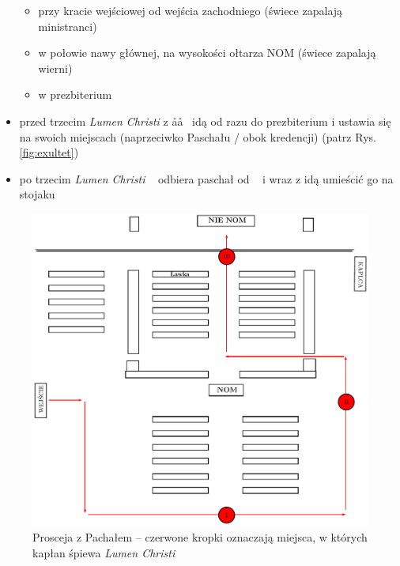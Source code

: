 \begin{itemize}
	      \begin{itemize}
		      \item przy kracie wejściowej od wejścia zachodniego (świece
		            zapalają ministranci)
		      \item w połowie nawy głównej, na wysokości ołtarza NOM (świece
		            zapalają wierni)
		      \item w prezbiterium
	      \end{itemize}
	\item przed trzecim \textit{Lumen Christi}  z \aa\aa~ idą od razu do
	      prezbiterium i ustawia się na swoich miejscach (naprzeciwko
	      Paschału / obok kredencji) (patrz Rys.\ref{fig:exultet})
	\item po trzecim \textit{Lumen Christi} \mm~ odbiera paschał od \ii~ i wraz
	      z  idą umieścić go na stojaku
\end{itemize}

\begin{figure}[h]
	\centering
	\includegraphics[width=0.6\linewidth]{Figures/Sobota/procesja.pdf}
	\caption{Prosceja z Pachałem -- czerwone kropki oznaczają miejsca,
		w których kapłan śpiewa \textit{Lumen Christi}}
	\label{fig:procesja}
\end{figure}

